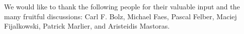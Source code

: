 \documentclass{sigplanconf}
\begin{document}


\acks
We would like to thank the following people for their valuable
input and the many fruitful discussions: Carl F. Bolz, Michael Faes,
Pascal Felber, Maciej Fijalkowski, Patrick Marlier, and Aristeidis Mastoras.




\end{document}
